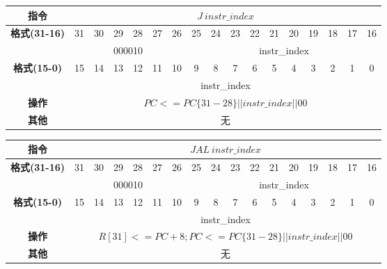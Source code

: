 \documentclass[11pt,utf8]{article}
\begin{document}
\begin{center}
\begin{tabular}{|c|c|c|c|c|c|c|c|c|c|c|c|c|c|c|c|c|}
\hline
\textbf{指令} & \multicolumn{16}{c|}{$J~instr\_index$} \\
\hline
\multirow{2}{*}{\textbf{格式(31-16)}} & 31 & 30 & 29 & 28 & 27 & 26 & 25 & 24 & 23 & 22 & 21 & 20 & 19 & 18 & 17 & 16 \\ 
\cline{2-17}
& \multicolumn{6}{c|}{000010} & \multicolumn{10}{c|}{instr\_index}\\
\hline
\multirow{2}{*}{\textbf{格式(15-0)}} & 15 & 14 & 13 & 12 & 11 & 10 & 9 & 8 & 7 & 6 & 5 & 4 & 3 & 2 & 1 & 0 \\
\cline{2-17}
& \multicolumn{16}{c|}{instr\_index}\\
\hline
\textbf{操作} & \multicolumn{16}{c|}{$PC <= PC\{31-28\}||instr\_index || 00$} \\
\hline
\textbf{其他} & \multicolumn{16}{c|}{无} \\
\hline
\end{tabular}
\end{center}

\begin{center}
\begin{tabular}{|c|c|c|c|c|c|c|c|c|c|c|c|c|c|c|c|c|}
\hline
\textbf{指令} & \multicolumn{16}{c|}{$JAL~instr\_index$} \\
\hline
\multirow{2}{*}{\textbf{格式(31-16)}} & 31 & 30 & 29 & 28 & 27 & 26 & 25 & 24 & 23 & 22 & 21 & 20 & 19 & 18 & 17 & 16 \\ 
\cline{2-17}
& \multicolumn{6}{c|}{000010} & \multicolumn{10}{c|}{instr\_index}\\
\hline
\multirow{2}{*}{\textbf{格式(15-0)}} & 15 & 14 & 13 & 12 & 11 & 10 & 9 & 8 & 7 & 6 & 5 & 4 & 3 & 2 & 1 & 0 \\
\cline{2-17}
& \multicolumn{16}{c|}{instr\_index}\\
\hline
\textbf{操作} & \multicolumn{16}{c|}{$R[31]<=PC+8;PC<=PC\{31-28\}||instr\_index||00$} \\
\hline
\textbf{其他} & \multicolumn{16}{c|}{无} \\
\hline
\end{tabular}
\end{center}
\end{document}
